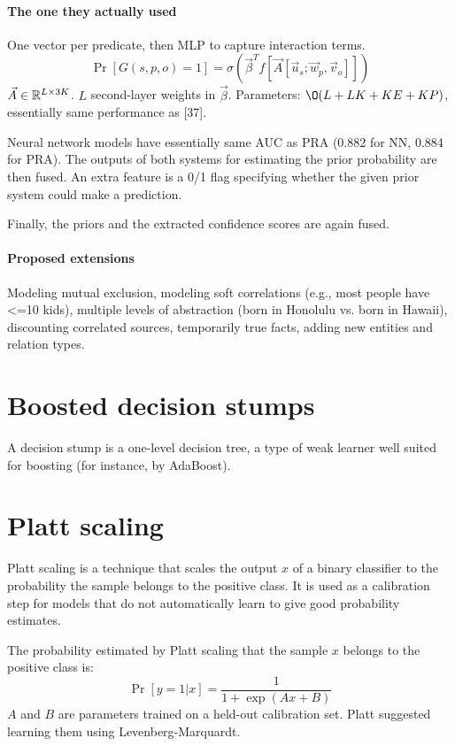 \paragraph{The one they actually used}
One vector per predicate, then MLP to capture interaction terms.
$$\Pr[G(s,p,o)=1]=\sigma(\vec{\beta}^T f[\vec{A} [\vec{u}_s; \vec{w}_p, \vec{v}_o] ])$$
$\vec{A}\in\mathbb{R}^{L\times 3K}$.
$L$ second-layer weights in $\vec{\beta}$.
Parameters: $\O(L+LK+KE+KP)$, essentially same performance as [37].

Neural network models have essentially same AUC as PRA
(0.882 for NN, 0.884 for PRA).
The outputs of both systems for estimating the prior probability are then
fused. An extra feature is a 0/1 flag specifying whether the given prior system
could make a prediction.

Finally, the priors and the extracted confidence scores are again fused.

\paragraph{Proposed extensions}
Modeling mutual exclusion, modeling soft correlations
(e.g., most people have <=10 kids), multiple levels of abstraction (born in
Honolulu vs. born in Hawaii), discounting correlated sources, temporarily true
facts, adding new entities and relation types.

\section{Boosted decision stumps}
\label{boosted-decision-stumps}
A decision stump is a one-level decision tree, a type of weak learner
well suited for boosting (for instance, by AdaBoost).

\section{Platt scaling}
\label{platt-scaling}

Platt scaling\cite{platt-scaling} is a technique that scales the output $x$ of a binary classifier
to the probability the sample belongs to the positive class. It is used as a
calibration step for models that do not automatically learn to give good
probability estimates.

The probability estimated by Platt scaling that the sample $x$ belongs to the
positive class is:
$$\Pr[y=1|x] = \frac{1}{1+\exp(Ax+B)}$$
$A$ and $B$ are parameters trained on a held-out calibration set.
Platt suggested learning them using Levenberg-Marquardt.

